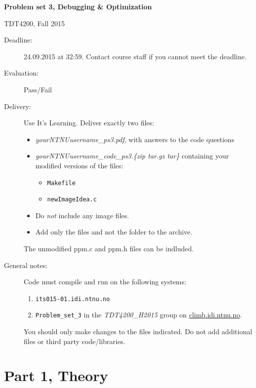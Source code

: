 \documentclass[10pt,a4paper]{article}
\newcommand{\PROBSET}{3}
\begin{document}

{\noindent \LARGE \textbf{Problem set \PROBSET, Debugging \& Optimization}}

{\noindent \large TDT4200, Fall 2015}

\begin{description}
	\item[Deadline:] 24.09.2015 at 32:59. Contact course staff if you cannot meet the deadline.
	\item[Evaluation:] Pass/Fail
	\item[Delivery:] Use It's Learning. Deliver exactly two files:
		\begin{itemize}
			\item \emph{yourNTNUusername\_ps\PROBSET.pdf}, with answers to the code questions
			\item \emph{yourNTNUusername\_code\_ps\PROBSET.\{zip \textbar tar.gz \textbar tar\}}
				containing your modified versions of the files:
				\begin{itemize}
					\item \texttt{Makefile}
					\item \texttt{newImageIdea.c}
				\end{itemize}
				\item Do \emph{not} include any image files.
				\item Add only the files and not the folder to the archive.
				
		\end{itemize}
		The unmodified ppm.c and ppm.h files can be indluded.

	\item[General notes:] Code must compile and run on the following systems:
	\begin{enumerate}
		\item \texttt{its015-01.idi.ntnu.no}
		\item \texttt{Problem\_set\_\PROBSET} in the \textit{TDT4200\_H2015} group on \url{climb.idi.ntnu.no}.
	\end{enumerate}
		You should only make changes to the files indicated.
		Do not add additional files or third party code/libraries.
\end{description}


\section*{Part 1, Theory}
\end{document}

